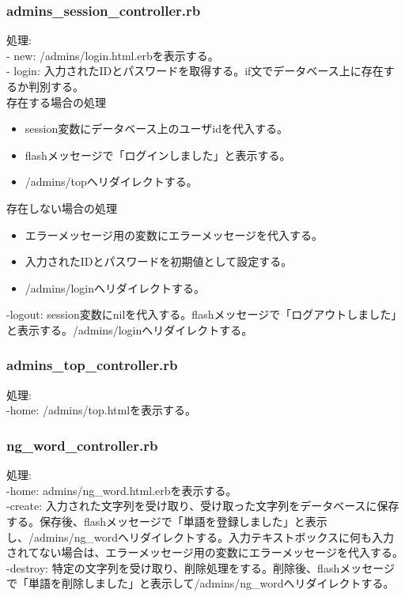 \documentclass[a4j]{jarticle}
\begin{document}
\subsubsection{admins\_session\_controller.rb}
\noindent
処理:  \\
- new: /admins/login.html.erbを表示する。\\
- login: 入力されたIDとパスワードを取得する。if文でデータベース上に存在するか判別する。\\
存在する場合の処理\\
\begin{itemize}
\item session変数にデータベース上のユーザidを代入する。
\item flashメッセージで「ログインしました」と表示する。
\item /admins/topへリダイレクトする。\\
\end{itemize}
存在しない場合の処理\\
\begin{itemize}
\item エラーメッセージ用の変数にエラーメッセージを代入する。
\item 入力されたIDとパスワードを初期値として設定する。
\item /admins/loginへリダイレクトする。\\
\end{itemize}
-logout: session変数にnilを代入する。flashメッセージで「ログアウトしました」と表示する。/admins/loginへリダイレクトする。

\subsubsection{admins\_top\_controller.rb}
\noindent
処理:  \\
-home: /admins/top.htmlを表示する。

\subsubsection{ng\_word\_controller.rb}
\noindent
処理:  \\
-home: admins/ng\_word.html.erbを表示する。\\
-create: 入力された文字列を受け取り、受け取った文字列をデータベースに保存する。保存後、flashメッセージで「単語を登録しました」と表示し、/admins/ng\_wordへリダイレクトする。入力テキストボックスに何も入力されてない場合は、エラーメッセージ用の変数にエラーメッセージを代入する。\\
-destroy: 特定の文字列を受け取り、削除処理をする。削除後、flashメッセージで「単語を削除しました」と表示して/admins/ng\_wordへリダイレクトする。
\end{document}
